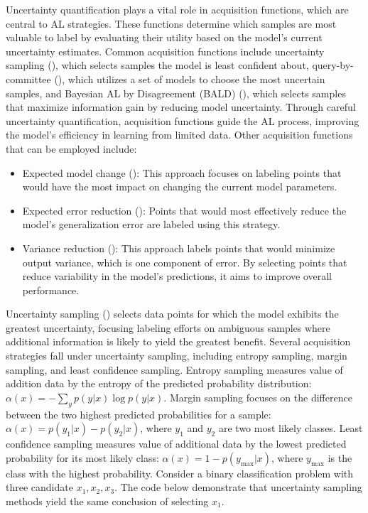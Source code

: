 \documentclass[
  letterpaper,
  numbers=noenddot,
  DIV=11]{scrreprt}
\theoremstyle{plain}
\theoremstyle{definition}
\theoremstyle{remark}
\begin{document}
Uncertainty quantification plays a vital role in acquisition functions,
which are central to AL strategies. These functions determine which
samples are most valuable to label by evaluating their utility based on
the model's current uncertainty estimates. Common acquisition functions
include uncertainty sampling (), which selects samples the model is least confident about,
query-by-committee (),
which utilizes a set of models to choose the most uncertain samples, and
Bayesian AL by Disagreement (BALD) (), which selects samples that maximize information gain by
reducing model uncertainty. Through careful uncertainty quantification,
acquisition functions guide the AL process, improving the model's
efficiency in learning from limited data. Other acquisition functions
that can be employed include:

\begin{itemize}
\item
  Expected model change (): This approach focuses on labeling points that would
  have the most impact on changing the current model parameters.
\item
  Expected error reduction (): Points that would most effectively reduce the model's
  generalization error are labeled using this strategy.
\item
  Variance reduction (): This approach labels points that would minimize output
  variance, which is one component of error. By selecting points that
  reduce variability in the model's predictions, it aims to improve
  overall performance.
\end{itemize}

Uncertainty sampling ()
selects data points for which the model exhibits the greatest
uncertainty, focusing labeling efforts on ambiguous samples where
additional information is likely to yield the greatest benefit. Several
acquisition strategies fall under uncertainty sampling, including
entropy sampling, margin sampling, and least confidence sampling.
Entropy sampling measures value of addition data by the entropy of the
predicted probability distribution:
\(\alpha(x) = - \sum_{y} p(y|x) \log p(y|x)\). Margin sampling focuses
on the difference between the two highest predicted probabilities for a
sample: \(\alpha(x) = p(y_1|x) - p(y_2|x)\), where \(y_1\) and \(y_2\)
are two most likely classes. Least confidence sampling measures value of
additional data by the lowest predicted probability for its most likely
class: \(\alpha(x) = 1 - p(y_{\text{max}}|x)\), where \(y_{\text{max}}\)
is the class with the highest probability. Consider a binary
classification problem with three candidate \(x_1, x_2, x_3\). The code
below demonstrate that uncertainty sampling methods yield the same
conclusion of selecting \(x_1\).
\end{document}
